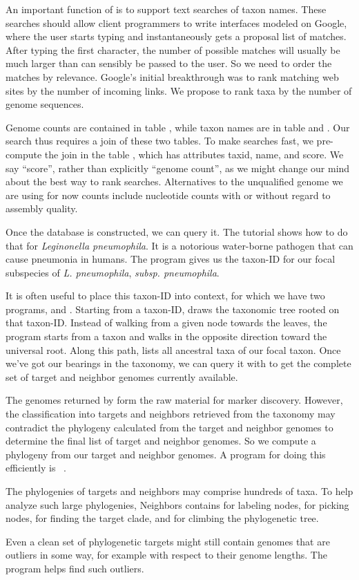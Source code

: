 An important function of  is to support text searches of
taxon names. These searches should allow client programmers to write
interfaces modeled on Google, where the user starts typing and
instantaneously gets a proposal list of matches. After typing the
first character, the number of possible matches will usually be much
larger than can sensibly be passed to the user. So we need to order
the matches by relevance. Google's initial breakthrough was to rank
matching web sites by the number of incoming links. We propose to rank
taxa by the number of genome sequences.

Genome counts are contained in table , while taxon
names are in table  and . Our search thus requires a join of
these two tables. To make searches fast, we pre-compute the join in
the table , which has attributes taxid, name, and score. We
say ``score'', rather than explicitly ``genome count'', as we might
change our mind about the best way to rank searches. Alternatives to
the unqualified genome we are using for now counts include nucleotide
counts with or without regard to assembly quality.

Once the database is constructed, we can query it. The tutorial shows
how to do that for \emph{Leginonella pneumophila}. It is a notorious
water-borne pathogen that can cause pneumonia in humans. The
program  gives us the taxon-ID for our focal subspecies
of \emph{L. pneumophila}, \emph{subsp. pneumophila}.

It is often useful to place this taxon-ID into context, for which we
have two programs,  and . Starting from a
taxon-ID,  draws the taxonomic tree rooted on that
taxon-ID. Instead of walking from a given node towards the leaves, the
program  starts from a taxon and walks in the opposite
direction toward the universal root. Along this path,  lists
all ancestral taxa of our focal taxon. Once we've got our bearings in
the taxonomy, we can query it with  to get the complete
set of target and neighbor genomes currently available.

The genomes returned by  form the raw material for
marker discovery. However, the classification into targets and
neighbors retrieved from the taxonomy may contradict the phylogeny
calculated from the target and neighbor genomes to determine the final
list of target and neighbor genomes. So we compute a phylogeny from
our target and neighbor genomes. A program for doing this efficiently
is ~\cite{klo20:phy}.

The phylogenies of targets and neighbors may comprise hundreds of
taxa. To help analyze such large phylogenies, Neighbors
contains  for labeling nodes,  for picking nodes,
 for finding the target clade, and  for climbing
the phylogenetic tree.

Even a clean set of phylogenetic targets might still contain genomes
that are outliers in some way, for example with respect to their
genome lengths. The program  helps find such
outliers.
